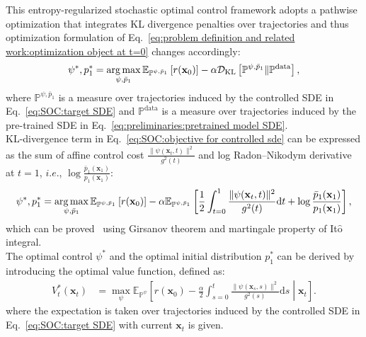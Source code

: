 This entropy-regularized stochastic optimal control framework adopts a pathwise optimization that integrates KL divergence penalties over trajectories and thus optimization formulation of Eq.~\ref{eq:problem definition and related work:optimization object at t=0} changes accordingly:
\begin{align}
    \label{eq:SOC:objective for controlled sde}
    \psi^*, p^*_1 = \operatorname*{arg\,max}_{\psi, \bar{p}_1} \mathbb{E}_{\mathbb{P}^{\psi, \bar{p}_1}}\left[ r(\mathbf{x}_0) \right]-\alpha \mathcal{D}_{\text{KL}}\left[ \mathbb{P}^{\psi, \bar{p}_1} \|\mathbb{P}^{\text{data}} \right],
\end{align}
where $\mathbb{P}^{\psi, \bar{p}_1}$ is a measure over trajectories induced by the controlled SDE in Eq.~\ref{eq:SOC:target SDE} and $\mathbb{P}^{\text{data}}$ is a measure over trajectories induced by the pre-trained SDE in Eq.~\ref{eq:preliminaries:pretrained model SDE}.\\
KL-divergence term in Eq.~\ref{eq:SOC:objective for controlled sde} can be expressed as the sum of affine control cost $ \frac{\| \psi(\mathbf{x}_t, t) \|^2}{g^2(t)}$ and log Radon–Nikodym derivative at $t=1$, $i.e.$, $\log \frac{\bar{p}_1(\mathbf{x}_1)}{p_1(\mathbf{x}_1)}$:
\begin{align}
    \label{eq:SOC:objective for controlled sde girsanov}
    \psi^*, p^*_1 = \operatorname*{arg\,max}_{\psi, \bar{p}_1} \mathbb{E}_{\mathbb{P}^{\psi, \bar{p}_1}}\left[ r(\mathbf{x}_0) \right]-\alpha\mathbb{E}_{\mathbb{P}^{\psi, \bar{p}_1}}\left[ \frac{1}{2} \int_{t=0}^1 \frac{\| \psi(\mathbf{x}_t, t) \|^2}{g^2(t)}\mathrm{d}t+\log \frac{\bar{p}_1(\mathbf{x}_1)}{p_1(\mathbf{x}_1)} \right],
\end{align}
which can be proved~\cite{uehara2024finetuningcontinuoustimediffusionmodels, domingo-enrich2025adjoint} using Girsanov theorem and martingale property of It$\hat{\text{o}}$ integral.\\
The optimal control $\psi^*$ and the optimal initial distribution $p_1^*$ can be derived by introducing the optimal value function, defined as:
\begin{align}
    \label{eq:SOC:optimal value funtion}
    V_t^*(\mathbf{x}_t)&=  \max_{\psi} \mathbb{E}_{\mathbb{P}^{\psi}}\left[ r(\mathbf{x}_0)- \frac{\alpha}{2}\int_{s=0}^t \frac{\| \psi(\mathbf{x}_s, s) \|^2}{g^2(s)}\mathrm{d}s \middle| \mathbf{x}_t \right].
\end{align}
where the expectation is taken over trajectories induced by the controlled SDE in Eq.~\ref{eq:SOC:target SDE} with current $\mathbf{x}_t$ is given.

